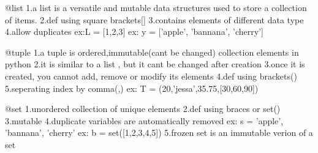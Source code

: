 @list
1.a list is a versatile and mutable data
  structures used to store a collection of items.
2.def using square brackets[]
3.contains elements of different data type
4.allow duplicates
ex:L = [1,2,3]
ex: y = ['apple', 'bannana', 'cherry']


@tuple
1.a tuple is ordered,immutable(cant be changed)
  collection elements in python
2.it is similar to a list ,
  but it cant be changed after creation
3.once it is created, you cannot add,
  remove or modify its elements
4.def using brackets()
5.seperating index by comma(,)
ex: T = (20,'jessa',35.75,[30,60,90])

@set
1.unordered collection of unique elements
2.def using braces{} or set()
3.mutable
4.duplicate variables are automatically removed
ex: s = {'apple', 'bannana', 'cherry'}
ex: b = set([1,2,3,4,5])
5.frozen set is an immutable verion of a set

